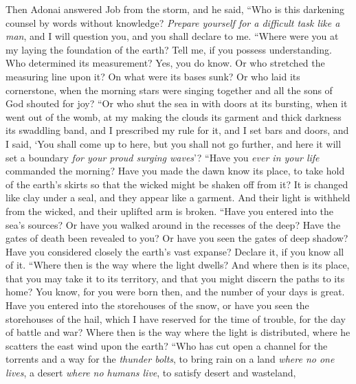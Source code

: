 \begin{biblechapter} %
 Then Adonai answered Job from the storm, and he said,
\verse “Who is this darkening counsel 
by words without knowledge?
\verse \textit{Prepare yourself for a difficult task like a man}, 
and I will question you, and you shall declare to me.
 “Where were you at my laying the foundation of the earth? 
Tell me, if you possess understanding.
\verse Who determined its measurement? Yes, you do know. 
Or who stretched the measuring line upon it?
\verse On what were its bases sunk? 
Or who laid its cornerstone,
\verse when the morning stars were singing together 
and all the sons of God shouted for joy?
\verse “Or who shut the sea in with doors 
at its bursting, when it went out of the womb,
\verse at my making the clouds its garment 
and thick darkness its swaddling band,
\verse and I prescribed my rule for it, 
and I set bars and doors,
\verse and I said, ‘You shall come up to here, but you shall not go further, 
and here it will set a boundary \textit{for your proud surging waves}’?
\verse “Have you \textit{ever in your life} commanded the morning? 
Have you made the dawn know its place,
\verse to take hold of the earth’s skirts 
so that the wicked might be shaken off from it?
\verse It is changed like clay under a seal, 
and they appear like a garment.
\verse And their light is withheld from the wicked, 
and their uplifted arm is broken.
\verse “Have you entered into the sea’s sources? 
Or have you walked around in the recesses of the deep?
\verse Have the gates of death been revealed to you? 
Or have you seen the gates of deep shadow?
\verse Have you considered closely the earth’s vast expanse? 
Declare it, if you know all of it.
\verse “Where then is the way where the light dwells? 
And where then is its place,
\verse that you may take it to its territory, 
and that you might discern the paths to its home?
\verse You know, for you were born then, 
and the number of your days is great.
\verse Have you entered into the storehouses of the snow, 
or have you seen the storehouses of the hail,
\verse which I have reserved for the time of trouble, 
for the day of battle and war?
\verse Where then is the way where the light is distributed, 
where he scatters the east wind upon the earth?
\verse “Who has cut open a channel for the torrents 
and a way for the \textit{thunder bolts},
\verse to bring rain on a land \textit{where no one lives}, 
a desert \textit{where no humans live},
\verse to satisfy desert and wasteland, 

\end{biblechapter}
